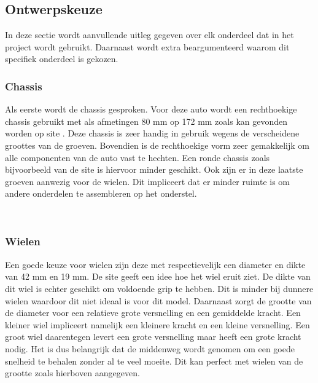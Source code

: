 \documentclass[a4paper,twoside,kulak]{kulakreport} %
\begin{document}


\subsection{Ontwerpskeuze}

In deze sectie wordt aanvullende uitleg gegeven over elk onderdeel dat in het project wordt gebruikt. Daarnaast wordt extra beargumenteerd waarom dit specifiek onderdeel is gekozen.

\subsubsection{Chassis}
Als eerste wordt de chassis gesproken. Voor deze auto wordt een rechthoekige chassis gebruikt met als afmetingen 80 mm op 172 mm zoals kan gevonden worden op site \cite{RobotChassisRechthoekigZwart}. %
Deze chassis is zeer handig in gebruik wegens de verscheidene groottes van de groeven. Bovendien is de rechthoekige vorm zeer gemakkelijk om alle componenten van de auto vast te hechten. Een ronde chassis zoals bijvoorbeeld van de site \cite{RobotChassis} is hiervoor minder geschikt. Ook zijn er in deze laatste groeven aanwezig voor de wielen. Dit impliceert dat er minder ruimte is om andere onderdelen te assembleren op het onderstel. 

~
\subsubsection{Wielen}
Een goede keuze voor wielen zijn deze met respectievelijk een diameter en dikte van 42 mm en 19 mm. De site \cite{Wiel42x19mm} geeft een idee hoe het wiel eruit ziet. De dikte van dit wiel is echter geschikt om voldoende grip te hebben. Dit is minder bij dunnere wielen waardoor dit niet ideaal is voor dit model. Daarnaast zorgt de grootte van de diameter voor een relatieve grote versnelling en een gemiddelde kracht. Een kleiner wiel impliceert namelijk een kleinere kracht en een kleine versnelling. Een groot wiel daarentegen levert een grote versnelling maar heeft een grote kracht nodig. Het is dus belangrijk dat de middenweg wordt genomen om een goede snelheid te behalen zonder al te veel moeite. Dit kan perfect met wielen van de grootte zoals hierboven aangegeven. 
\end{document}
